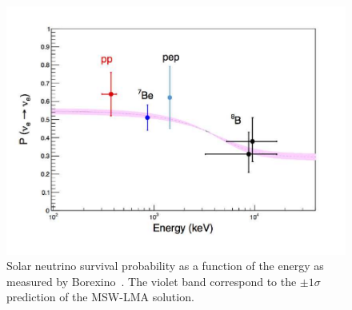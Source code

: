 \begin{figure}[htbp]
\centering
\includegraphics[width=0.6\linewidth]{figures/derbin_fig5c.pdf}
  \caption{
  Solar neutrino survival probability as a function of the energy as measured by Borexino~\cite{Derbin:2016cfw}. The violet band correspond to the $\pm1\sigma$ prediction of the MSW-LMA solution.
}
 \label{fig:sol-bor}
 \end{figure}
